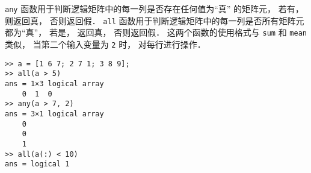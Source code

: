 \lstinline|any| 函数用于判断逻辑矩阵中的每一列是否存在任何值为“真” 的矩阵元， 若有， 则返回真， 否则返回假． \lstinline|all| 函数用于判断逻辑矩阵中的每一列是否所有矩阵元都为“真”， 若是， 返回真， 否则返回假． 这两个函数的使用格式与 \lstinline|sum| 和 \lstinline|mean| 类似， 当第二个输入变量为 \lstinline|2| 时， 对每行进行操作．
\begin{lstlisting}[language=MatlabCom]
>> a = [1 6 7; 2 7 1; 3 8 9];
>> all(a > 5)
ans = 1×3 logical array
    0  1  0
>> any(a > 7, 2)
ans = 3×1 logical array
    0
    0
    1
>> all(a(:) < 10)
ans = logical 1
\end{lstlisting}
